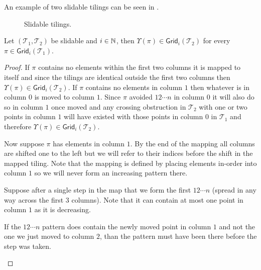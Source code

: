 An example of two slidable tilings can be seen in .

\begin{figure}[ht]
    \centering
    
    \caption{Slidable tilings.}
    \label{fig:slidable_tilings}
\end{figure}

\begin{lemma}\label{lem:slidemap}
Let $(\mathcal{T}_1,\mathcal{T}_2)$ be slidable and $i \in \mathbb{N}$, then $\Upsilon(\pi) \in \textsf{Grid}_i(\mathcal{T}_2)$ for every $\pi \in \textsf{Grid}_i(\mathcal{T}_1)$.
\end{lemma}
\begin{proof}
If $\pi$ contains no elements within the first two columns it is mapped to itself and since the tilings are identical outside the first two columns then $\Upsilon(\pi) \in \textsf{Grid}_i(\mathcal{T}_2)$. If $\pi$ contains no elements in column $1$ then whatever is in column $0$ is moved to column $1$. Since $\pi$ avoided $12\dotsm n$ in column $0$ it will also do so in column $1$ once moved and any crossing obstruction in $\mathcal{T}_2$ with one or two points in column $1$ will have existed with those points in column $0$ in $\mathcal{T}_1$ and therefore $\Upsilon(\pi) \in \textsf{Grid}_i(\mathcal{T}_2)$.

Now suppose $\pi$ has elements in column $1$. By the end of the mapping all columns are shifted one to the left but we will refer to their indices before the shift in the mapped tiling. Note that the mapping is defined by placing elements in-order into column $1$ so we will never form an increasing pattern there. 

Suppose after a single step in the map that we form the first $12\cdots n$ (spread in any way across the first $3$ columns). Note that it can contain at most one point in column $1$ as it is decreasing.

If the $12\cdots n$ pattern does contain the newly moved point in column $1$ and not the one we just moved to column $2$, than the pattern must have been there before the step was taken.

\begin{center}
\end{center}


\end{proof}
